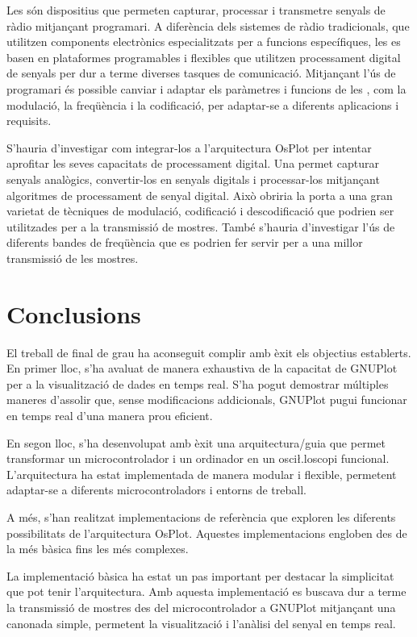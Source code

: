 \documentclass{tfgitic}[2023/06/30]
\begin{document}
Les  són dispositius que permeten capturar, processar i
transmetre senyals de ràdio mitjançant programari. A diferència dels
sistemes de ràdio tradicionals, que utilitzen components electrònics
especialitzats per a funcions específiques, les  es basen en
plataformes programables i flexibles que utilitzen processament
digital de senyals per dur a terme diverses tasques de comunicació.
Mitjançant l'ús de programari és possible canviar i adaptar els
paràmetres i funcions de les , com la modulació, la
freqüència i la codificació, per adaptar-se a diferents aplicacions i
requisits.

S'hauria d'investigar com integrar-los a l'arquitectura OsPlot per
intentar aprofitar les seves capacitats de processament digital. Una
 permet capturar senyals analògics, convertir-los en senyals
digitals i processar-los mitjançant algoritmes de processament de
senyal digital. Això obriria la porta a una gran varietat de tècniques
de modulació, codificació i descodificació que podrien ser utilitzades
per a la transmissió de mostres. També s'hauria d'investigar l'ús de
diferents bandes de freqüència que es podrien fer servir per a una
millor transmissió de les mostres.

\chapter{Conclusions}

El treball de final de grau ha aconseguit complir amb èxit els
objectius establerts. En primer lloc, s'ha avaluat de manera
exhaustiva de la capacitat de GNUPlot per a la visualització de dades
en temps real. S'ha pogut demostrar múltiples maneres d'assolir que,
sense modificacions addicionals, GNUPlot pugui funcionar en temps real
d'una manera prou eficient.

En segon lloc, s'ha desenvolupat amb èxit una arquitectura/guia que
permet transformar un microcontrolador i un ordinador en un
osci\l.loscopi funcional. L'arquitectura ha estat implementada de
manera modular i flexible, permetent adaptar-se a diferents
microcontroladors i entorns de treball.

A més, s'han realitzat implementacions de referència que exploren les
diferents possibilitats de l'arquitectura OsPlot. Aquestes
implementacions engloben des de la més bàsica fins les més complexes.

La implementació bàsica ha estat un pas important per destacar la
simplicitat que pot tenir l'arquitectura. Amb aquesta implementació es
buscava dur a terme la transmissió de mostres des del microcontrolador
a GNUPlot mitjançant una canonada simple, permetent la visualització i
l'anàlisi del senyal en temps real.
\end{document}
